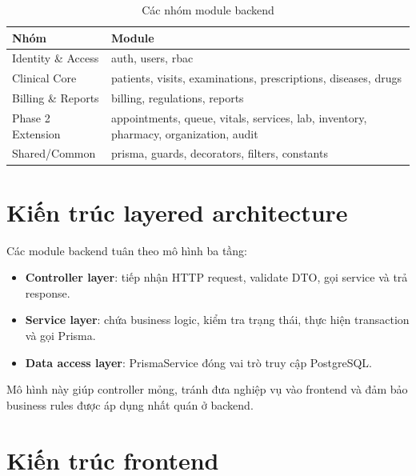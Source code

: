 \begin{table}[H]
\centering
\caption{Các nhóm module backend}
\begin{tabularx}{\textwidth}{|p{4cm}|X|}
\hline
\textbf{Nhóm} & \textbf{Module} \\
\hline
Identity \& Access & auth, users, rbac \\
\hline
Clinical Core & patients, visits, examinations, prescriptions, diseases, drugs \\
\hline
Billing \& Reports & billing, regulations, reports \\
\hline
Phase 2 Extension & appointments, queue, vitals, services, lab, inventory, pharmacy, organization, audit \\
\hline
Shared/Common & prisma, guards, decorators, filters, constants \\
\hline
\end{tabularx}
\end{table}


\section{Kiến trúc layered architecture}

Các module backend tuân theo mô hình ba tầng:

\begin{itemize}
    \item \textbf{Controller layer}: tiếp nhận HTTP request, validate DTO, gọi service và trả response.
    \item \textbf{Service layer}: chứa business logic, kiểm tra trạng thái, thực hiện transaction và gọi Prisma.
    \item \textbf{Data access layer}: PrismaService đóng vai trò truy cập PostgreSQL.
\end{itemize}

Mô hình này giúp controller mỏng, tránh đưa nghiệp vụ vào frontend và đảm bảo business rules được áp dụng nhất quán ở backend.


\section{Kiến trúc frontend}

